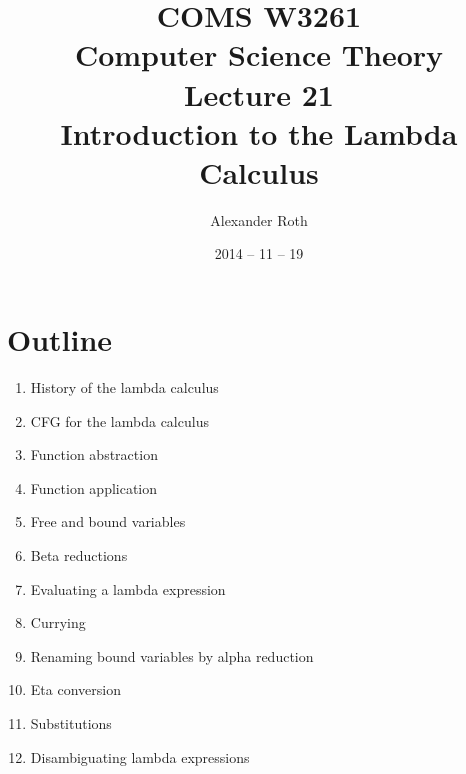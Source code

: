\documentclass[]{article}
\begin{document}
\newcommand*{\xml}[1]{\texttt{<#1>}}
\theoremstyle{definition}
\newtheorem{thm}{Theorem}
\title{COMS W3261 \\ Computer Science Theory \\ Lecture 21 \\ Introduction to the Lambda Calculus}
\author{Alexander Roth}
\date{2014 -- 11 -- 19}
\maketitle

\section*{Outline}
\begin{enumerate}
\item History of the lambda calculus
\item CFG for the lambda calculus
\item Function abstraction
\item Function application
\item Free and bound variables
\item Beta reductions
\item Evaluating a lambda expression
\item Currying
\item Renaming bound variables by alpha reduction
\item Eta conversion
\item Substitutions
\item Disambiguating lambda expressions
\end{enumerate}
\end{document}
